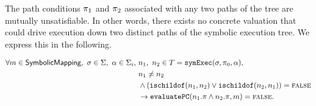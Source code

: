 \begin{property}
  \label{prop:kingunique}
The path conditions $\pi_1$ and $\pi_2$ associated with any two paths of the
tree are mutually unsatisfiable. In other words, there exists no concrete
valuation that could drive execution down two distinct paths of the symbolic
execution tree. We express this in the following.

\begin{align*}
\forall m \in \textsf{SymbolicMapping},~\sigma \in \Sigma,~\alpha \in
\Sigma_i,~& n_1,~ n_2 \in T =
\mathtt{symExec}(\sigma,\pi_0,\alpha), \\
& n_1 \neq n_2 \\
&  \wedge
(\mathtt{ischildof}(n_1, n_2) \vee  \mathtt{ischildof}(n_2, n_1))= \mathtt{\textsc{false}} \\
&\rightarrow \mathtt{evaluatePC}(n_1.\pi \wedge n_2.\pi,m) = \mathtt{\textsc{false}}.
\end{align*}

\end{property}

